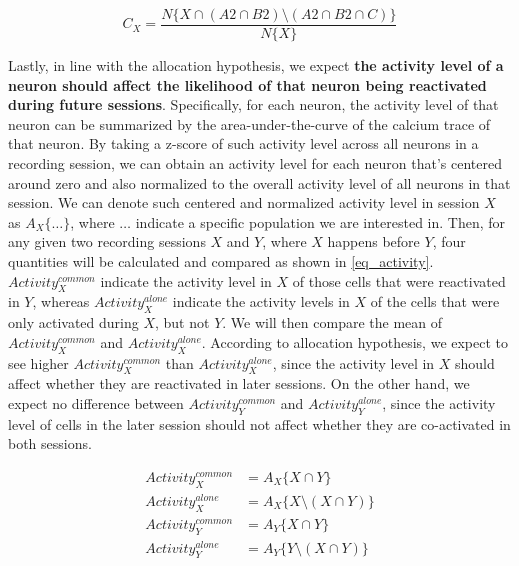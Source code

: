 \documentclass[master.tex]{subfiles}
\begin{document}
\begin{figure}
  \begin{equation} \label{eq_contrib} C_{X} = \frac{N\{X \cap (A2 \cap B2)
      \setminus (A2 \cap B2 \cap C)\}}{N\{X\}}
  \end{equation}
  \vspace{-15pt}
\end{figure}

Lastly, in line with the allocation hypothesis, we expect \textbf{the activity
  level of a neuron should affect the likelihood of that neuron being
  reactivated during future sessions}. Specifically, for each neuron, the
activity level of that neuron can be summarized by the area-under-the-curve of
the calcium trace of that neuron. By taking a z-score of such activity level
across all neurons in a recording session, we can obtain an activity level for
each neuron that's centered around zero and also normalized to the overall
activity level of all neurons in that session. We can denote such centered and
normalized activity level in session $X$ as $A_X\{\ldots\}$, where $\ldots$
indicate a specific population we are interested in. Then, for any given two
recording sessions $X$ and $Y$, where $X$ happens before $Y$, four quantities
will be calculated and compared as shown in \autoref{eq_activity}.
$Activity_{X}^{common}$ indicate the activity level in $X$ of those cells that
were reactivated in $Y$, whereas $Activity_{X}^{alone}$ indicate the activity
levels in $X$ of the cells that were only activated during $X$, but not $Y$. We
will then compare the mean of $Activity_{X}^{common}$ and
$Activity_{X}^{alone}$. According to allocation hypothesis, we expect to see
higher $Activity_{X}^{common}$ than $Activity_{X}^{alone}$, since the activity
level in $X$ should affect whether they are reactivated in later sessions. On
the other hand, we expect no difference between $Activity_{Y}^{common}$ and
$Activity_{Y}^{alone}$, since the activity level of cells in the later session
should not affect whether they are co-activated in both sessions.

\begin{figure}
  \vspace{-15pt}
  \begin{align} \label{eq_activity}
    Activity_{X}^{common} & = A_X\{X \cap Y\} \nonumber \\
    Activity_{X}^{alone} & = A_X\{X \setminus (X \cap Y)\} \nonumber \\
    Activity_{Y}^{common} & = A_Y\{X \cap Y\} \nonumber \\
    Activity_{Y}^{alone} & = A_Y\{Y \setminus (X \cap Y)\}
  \end{align}
  \vspace{-25pt}
\end{figure}
\end{document}

